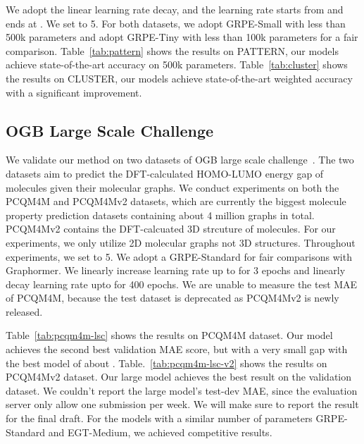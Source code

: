 \documentclass[letterpaper]{article} \usepackage{aaai23}  \usepackage{times}  \usepackage{helvet}  \usepackage{courier}  \usepackage[hyphens]{url}  \usepackage{graphicx} \urlstyle{rm} \def\UrlFont{\rm}  \usepackage{natbib}  \usepackage{caption} \frenchspacing  \setlength{\pdfpagewidth}{8.5in} \setlength{\pdfpageheight}{11in} \usepackage{algorithm}
\begin{document}
We adopt the linear learning rate decay, and the learning rate starts from  and ends at .
We set  to 5. 
For both datasets, we adopt GRPE-Small with less than 500k parameters and adopt GRPE-Tiny with less than 100k parameters for a fair comparison.
Table~\ref{tab:pattern} shows the results on PATTERN, our models achieve state-of-the-art accuracy on 500k parameters.
Table~\ref{tab:cluster} shows the results on CLUSTER, our models achieve state-of-the-art weighted accuracy with a significant improvement.







\subsection{OGB Large Scale Challenge}





We validate our method on two datasets of OGB large scale challenge~\citep{hu2020open}.
The two datasets aim to predict the DFT-calculated HOMO-LUMO energy gap of molecules given their molecular graphs. 
We conduct experiments on both the PCQM4M and PCQM4Mv2 datasets, which are currently the biggest molecule property prediction datasets containing about 4 million graphs in total.
PCQM4Mv2 contains the DFT-calcuated 3D strcuture of molecules.
For our experiments, we only utilize 2D molecular graphs not 3D structures.
Throughout experiments, we set  to 5. 
We adopt a GRPE-Standard for fair comparisons with Graphormer.
We linearly increase learning rate up to  for 3 epochs and linearly decay learning rate upto  for 400 epochs.
We are unable to measure the test MAE of PCQM4M, because the test dataset is deprecated as PCQM4Mv2 is newly released.

Table~\ref{tab:pcqm4m-lsc} shows the results on PCQM4M dataset. 
Our model achieves the second best validation MAE score, but with a very small gap with the best model of about . 
Table.~\ref{tab:pcqm4m-lsc-v2} shows the results on PCQM4Mv2 dataset.
Our large model achieves the best result on the validation dataset.
We couldn't report the large model's test-dev MAE, since the evaluation server only allow one submission per week. 
We will make sure to report the result for the final draft.
For the models with a similar number of parameters GRPE-Standard and EGT-Medium, we achieved competitive results.
\end{document}
